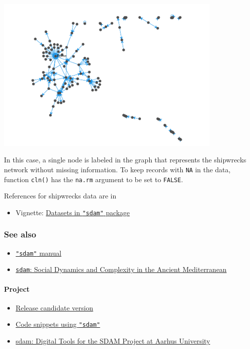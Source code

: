 \documentclass[a4paper,11pt]{memoir}
\providecommand{\tightlist}{%
  \setlength{\itemsep}{0pt}\setlength{\parskip}{0pt}}
\let\oldparagraph\paragraph
\renewcommand{\paragraph}[1]{\oldparagraph{#1}\mbox{}}
\begin{document}
{\centering
\includegraphics[width=11cm, trim=0 0 0 0, clip]{img/unnamed-chunk-12-1} 
}

In this case, a single node is labeled in the graph that represents the
shipwrecks network without missing information. To keep records with
\texttt{NA} in the data, function \texttt{cln()} has the
\texttt{\textquotesingle{}na.rm\textquotesingle{}} argument to be set to
\texttt{FALSE}.

\bigbreak
\bigbreak

References for shipwrecks data are in

\begin{itemize}
\tightlist
\item
  Vignette: \href{https://cran.r-project.org/web/packages/sdam/vignettes/Intro.html}{Datasets in \texttt{"sdam"} package}
\end{itemize}


\bigbreak
\bigbreak

\hypertarget{see-also}{%
\subsubsection{See also}\label{see-also}}


\begin{itemize}
\tightlist
\item
  \href{https://github.com/mplex/cedhar/blob/master/typesetting/reports/sdam.pdf}{\texttt{"sdam"}
  manual}
\item
  \href{https://CRAN.R-project.org/package=sdam}{\texttt{sdam}: Social Dynamics and
  Complexity in the Ancient Mediterranean}
\end{itemize}

\hypertarget{project}{%
\paragraph{Project}\label{project}}

\begin{itemize}
\tightlist
\item
  \href{https://github.com/sdam-au/sdam}{Release candidate version}
\item
  \href{https://github.com/sdam-au/R_code}{Code snippets using
  \texttt{"sdam"}}
\item
  \href{https://sdam-au.github.io/sdam-au/}{sdam: Digital Tools for the SDAM
  Project at Aarhus University}
\end{itemize}

~
\end{document}
